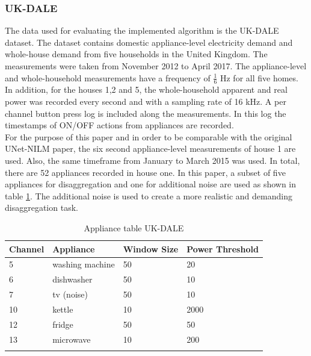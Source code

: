 \documentclass[sigconf]{acmart}
\begin{document}
\subsubsection{UK-DALE}
The data used for evaluating the implemented algorithm is the UK-DALE dataset\cite{UK-DALE}. 
The dataset contains domestic appliance-level electricity demand and whole-house demand from five households in the United Kingdom.
The measurements were taken from November 2012 to April 2017.
The appliance-level and whole-household measurements have a frequency of $\frac{1}{6}$ Hz for all five homes.%
In addition, for the houses 1,2 and 5, the whole-household apparent and real power was recorded every second and with a sampling rate of 16 kHz.
A per channel button press log is included along the measurements. 
In this log the timestamps of ON/OFF actions from appliances are recorded.\\
For the purpose of this paper and in order to be comparable with the original UNet-NILM paper, the six second appliance-level measurements of house 1 are used.
Also, the same timeframe from January to March 2015 was used.
In total, there are 52 appliances recorded in house one.
In this paper, a subset of five appliances for disaggregation and one for additional noise are used as shown in table \ref{table:appliance_list}.
The additional noise is used to create a more realistic and demanding disaggregation task.

\begin{table}
  \caption{Appliance table UK-DALE}
    \begin{tabular}{l l l l}
      \hline\hline
      Channel & Appliance & Window Size & Power Threshold\\
      \hline
      5 & washing machine & 50 & 20\\
      6 & dishwasher & 50 & 10\\
      7 & tv (noise) & 50 & 10\\
      10 & kettle & 10 & 2000\\
      12 & fridge & 50 & 50\\
      13 & microwave & 10 & 200\\
      \hline
      \label{table:appliance_list} 
    \end{tabular}
  \end{table}
\end{document}
